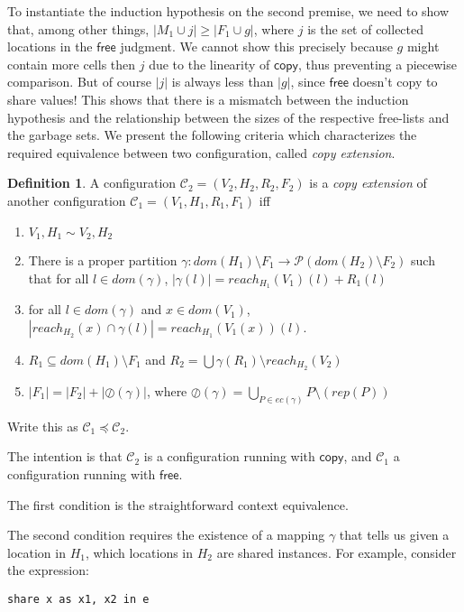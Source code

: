 \documentclass{easychair}
\newcommand{\ms}[1]{\ensuremath{\mathsf{#1}}}
\newcommand{\oh}[1]{\oslash(#1)}
\theoremstyle{definition}
\newtheorem{definition}{Definition}[section]
\begin{document}
To instantiate the induction hypothesis on the second premise, we need to show that, among 
other things, $|M_1 \cup j| \ge |F_1 \cup g|$, where $j$ is the set of collected locations in 
the $\ms{free}$ judgment. We cannot show this precisely because $g$ might contain more cells 
then $j$ due to the linearity of $\ms{copy}$, thus preventing a piecewise comparison. 
But of course $|j|$ is always less than $|g|$, since $\ms{free}$ doesn't copy to share 
values! This shows that there is a mismatch between the induction hypothesis and the relationship
between the sizes of the respective free-lists and the garbage sets. We present the following 
criteria which characterizes the required equivalence between two configuration,
called \emph{copy extension}.

\begin{definition}
A configuration $\mathcal{C}_2 = (V_2,H_2,R_2,F_2)$ is a \emph{copy extension} of another configuration
$\mathcal{C}_1 = (V_1,H_1,R_1,F_1)$ iff
\begin{enumerate}
\item $V_1,H_1 \sim V_2,H_2$
\item There is a proper partition $\gamma : dom(H_1) \setminus F_1 \to \mathcal{P}(dom(H_2) \setminus F_2)$ 
such that for all $l \in dom(\gamma)$, $|\gamma(l)| = reach_{H_1}(V_1)(l) + R_1(l)$
\item for all $l \in dom(\gamma)$ and $x \in dom(V_1)$, 
	$|reach_{H_2}(x) \cap \gamma(l)| = reach_{H_1}(V_1(x))(l)$.
\item $R_1 \subseteq dom(H_1) \setminus F_1$ and 
	$R_2 = \bigcup \gamma(R_1) \setminus reach_{H_2}(V_2)$
\item $|F_1| = |F_2| + |\oh{\gamma}|$, where 
	$\oh{\gamma} = \bigcup_{P \in ec(\gamma)} P \setminus (rep(P))$
\end{enumerate}
Write this as $\mathcal{C}_1 \preceq \mathcal{C}_2$.
\end{definition} 

The intention is that $\mathcal{C}_2$ is a configuration running with $\ms{copy}$, and 
$\mathcal{C}_1$ a configuration running with $\ms{free}$. 

The first condition is the straightforward context equivalence.

The second condition requires the existence of 
a mapping $\gamma$ that tells us given a location in $H_1$, which locations in $H_2$ 
are shared instances. For example, consider the expression: 

\begin{verbatim}
share x as x1, x2 in e
\end{verbatim}
\end{document}
